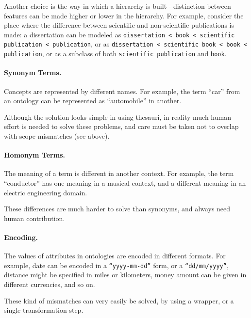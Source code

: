 Another choice is the way in which a hierarchy is built - distinction
between features can be made higher or lower in the hierarchy. For
example, consider the place where the difference between scientific and
non-scientific publications is made: a dissertation can be modeled as
\texttt{dissertation }\texttt{{\textless}
book {\textless} scientific publication {\textless} publication}, or as
\texttt{dissertation {\textless} scientific book
{\textless} book {\textless} publication}, or as a subclass of both
\texttt{scientific publication} and
\texttt{book}. 

\paragraph{Synonym Terms.}
Concepts are represented by different names. For example, the term
{\textquotedblleft}car{\textquotedblright} from an ontology can be
represented as {\textquotedblleft}automobile{\textquotedblright} in
another. 

Although the solution looks simple in using thesauri, in reality much
human effort is needed to solve these problems, and care must be taken
not to overlap with scope mismatches (see above). 

\paragraph{Homonym Terms.}
The meaning of a term is different in another context. For example, the
term {\textquotedblleft}conductor{\textquotedblright} has one meaning
in a musical context, and a different meaning in an electric
engineering domain. 

These differences are much harder to solve than synonyms, and always
need human contribution. 

\paragraph{Encoding.}
The values of attributes in ontologies are encoded in different formats.
For example, date can be encoded in a
\texttt{{\textquotedblleft}yyyy-mm-dd{\textquotedblright}}
form, or a
\texttt{{\textquotedblleft}dd/mm/yyyy{\textquotedblright}},
distance might be specified in miles or kilometers, money amount can be
given in different currencies, and so on. 

These kind of mismatches can very easily be solved, by using a wrapper,
or a single transformation step. 


